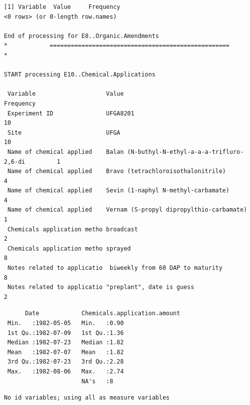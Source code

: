 \documentclass[
]{article}
\begin{document}
\begin{verbatim}
[1] Variable  Value     Frequency
<0 rows> (or 0-length row.names)

End of processing for E8..Organic.Amendments
*            ===================================================            *

START processing E10..Chemical.Applications

 Variable                    Value                                         Frequency
 Experiment ID               UFGA8201                                             10
 Site                        UFGA                                                 10
 Name of chemical applied    Balan (N-buthyl-N-ethyl-a-a-a-trifluro-2,6-di         1
 Name of chemical applied    Bravo (tetrachloroisothalonitrile)                    4
 Name of chemical applied    Sevin (1-naphyl N-methyl-carbamate)                   4
 Name of chemical applied    Vernam (S-propyl dipropylthio-carbamate)              1
 Chemicals application metho broadcast                                             2
 Chemicals application metho sprayed                                               8
 Notes related to applicatio  biweekly from 60 DAP to maturity                     8
 Notes related to applicatio "preplant", date is guess                             2
\end{verbatim}

\begin{verbatim}
      Date            Chemicals.application.amount
 Min.   :1982-05-05   Min.   :0.90                
 1st Qu.:1982-07-09   1st Qu.:1.36                
 Median :1982-07-23   Median :1.82                
 Mean   :1982-07-07   Mean   :1.82                
 3rd Qu.:1982-07-23   3rd Qu.:2.28                
 Max.   :1982-08-06   Max.   :2.74                
                      NA's   :8                   
\end{verbatim}

\begin{verbatim}
No id variables; using all as measure variables
\end{verbatim}
\end{document}
